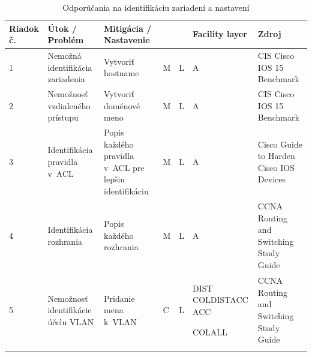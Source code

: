 \begin{longtable}[!htbp]{|C{2.5em}L{9em}L{9em}C{2em}C{2.5em}C{7.5em}L{10em}|}
	
	\hline
	\centering
	
	Riadok č.	&Útok / Problém	&Mitigácia / Nastavenie	& 	&	&Facility layer	&Zdroj\\
	\endhead
	
	 1	&Nemožná identifikácia zariadenia	&Vytvoriť hostname	&M	&L	&A	&CIS Cisco IOS 15 Benchmark \cite{CIS_DrTLsgXv24lxeIIM}\\
	2	&Nemožnosť vzdialeného prístupu	&Vytvoriť doménové meno	&M	&L	&A	&CIS Cisco IOS 15 Benchmark \cite{CIS_DrTLsgXv24lxeIIM}\\
	 3	&Identifikácia pravidla v~ACL	&Popis každého pravidla v~ACL pre lepšiu identifikáciu	&M	&L	&A	&Cisco Guide to Harden Cisco IOS Devices \cite{Singh2018}\\
	4	&Identifikácia rozhrania	&Popis každého rozhrania	&M	&L	&A	&CCNA Routing and Switching Study Guide \cite{Lammle2013}\\
	 5	&Nemožnosť identifikácie účelu VLAN	&Pridanie mena k~VLAN	&C	&L	&DIST
	COLDISTACC
	ACC
	
	COLALL	&CCNA Routing and Switching Study Guide \cite{Lammle2013}\\
	
	\hline
	\caption{Odporúčania na identifikáciu zariadení a nastavení}
	\label{tab:identification}%
\end{longtable}%


